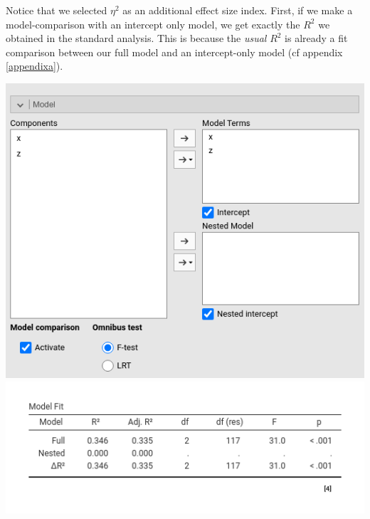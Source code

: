 \documentclass[
]{book}
\begin{document}
Notice that we selected \(\eta^2\) as an additional effect size index. First, if we make a model-comparison with an intercept only model, we get exactly the \(R^2\) we obtained in the standard analysis. This is because the \emph{usual} \(R^2\) is already a fit comparison between our full model and an intercept-only model (cf appendix \ref{appendixa}).

\includegraphics{bookletpics/2_modelcomparison_input5.png}
\includegraphics{bookletpics/2_modelcomparison_output5.png}
\end{document}
